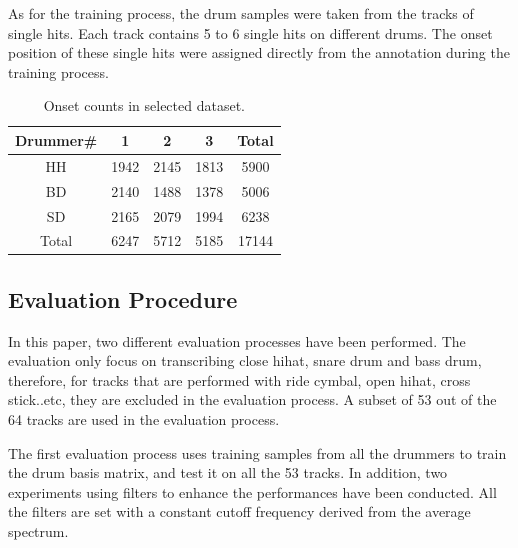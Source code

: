 \documentclass{article}
\begin{document}
As for the training process, the drum samples were taken from the tracks of single hits. Each track contains 5 to 6 single hits on different drums. The onset position of these single hits were assigned directly from the annotation during the training process.  
 
\begin{table}[h]
\begin{center}
\begin{tabular}{|c|c|c|c|c|}
\hline
Drummer\# & 1    & 2    & 3    & Total \\ \hline
HH        & 1942 & 2145 & 1813 & 5900  \\ \hline
BD        & 2140 & 1488 & 1378 & 5006  \\ \hline
SD        & 2165 & 2079 & 1994 & 6238  \\ \hline
Total     & 6247 & 5712 & 5185 & 17144 \\ \hline
\end{tabular}
 \caption{Onset counts in selected dataset.}
 \label{tab:onsetCount}
\end{center}
\end{table}

\subsection{Evaluation Procedure}\label{subsec:evaluation procedure}

In this paper, two different evaluation processes have been performed. The evaluation only focus on transcribing close hihat, snare drum and bass drum, therefore, for tracks that are performed with ride cymbal, open hihat, cross stick..etc, they are excluded in the evaluation process. A subset of 53 out of the 64 tracks are used in the evaluation process. 

The first evaluation process uses training samples from all the drummers to train the drum basis matrix, and test it on all the 53 tracks. In addition, two experiments using filters to enhance the performances have been conducted. All the filters are set with a constant cutoff frequency derived from the average spectrum. 
\end{document}
